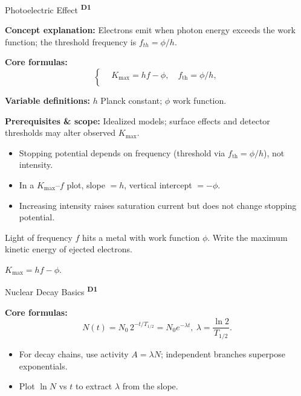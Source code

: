 ﻿\documentclass[12pt,a4paper]{article}
\providecommand{\KPFormulas}{}
\providecommand{\KPHeuristics}{}
\providecommand{\KPProblems}{}
\newcommand{\DOne}{\texorpdfstring{\textsuperscript{\textbf{D1}}}{ D1}}
\begin{document}
\begin{KnowledgePoint}{Photoelectric Effect \DOne}
  \KPFormulas
  \begin{formulabox}
  \textbf{Concept explanation:} Electrons emit when photon energy exceeds the work function; the threshold frequency is $f_{th}=\phi/h$.

  \textbf{Core formulas:}
  \[
  \left\{\begin{aligned}
    &K_{\max}=hf-\phi,\quad f_{\text{th}}=\phi/h,\\
  \end{aligned}\right.
  \]

  \textbf{Variable definitions:} $h$ Planck constant; $\phi$ work function.

  \textbf{Prerequisites \& scope:} Idealized models; surface effects and detector thresholds may alter observed $K_{\max}$.
  \end{formulabox}

  \KPHeuristics
  \begin{heuristicsbox}
  \begin{itemize}[leftmargin=*]
    \item Stopping potential depends on frequency (threshold via $f_{\text{th}}=\phi/h$), not intensity.
    \item In a $K_{\max}$--$f$ plot, slope $=h$, vertical intercept $=-\phi$.
    \item Increasing intensity raises saturation current but does not change stopping potential.
  \end{itemize}
  \end{heuristicsbox}

  \KPProblems
  \begin{cheatproblem}
  Light of frequency $f$ hits a metal with work function $\phi$. Write the maximum kinetic energy of ejected electrons.
  \begin{solutionbox}
  $K_{\max}=hf-\phi$.
  \end{solutionbox}
  \end{cheatproblem}
\end{KnowledgePoint}

\begin{KnowledgePoint}{Nuclear Decay Basics \DOne}
  \KPFormulas
  \begin{formulabox}
  \textbf{Core formulas:}
  \[
    N(t)=N_0\,2^{-t/T_{1/2}}=N_0 e^{-\lambda t},\ \lambda=\frac{\ln 2}{T_{1/2}}.
  \]
  \end{formulabox}
  \KPHeuristics
  \begin{heuristicsbox}
  \begin{itemize}[leftmargin=*]
    \item For decay chains, use activity $A=\lambda N$; independent branches superpose exponentials.
    \item Plot $\ln N$ vs $t$ to extract $\lambda$ from the slope.
  \end{itemize}
  \end{heuristicsbox}
\end{KnowledgePoint}
\end{document}
